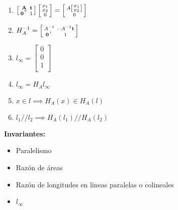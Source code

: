 \documentclass[12pt,a4paper]{article}
\begin{document}
\begin{itemize}
\begin{enumerate}
		\item $\left[ {\begin{smallmatrix}
		 {\bf A} & {\bf t}\\
		 {\bf 0}^{\top} & 1 \\
		\end{smallmatrix} } \right] \left[ {\begin{smallmatrix}
		 x_{1}\\
		 x_{2}\\
		 0\\
		\end{smallmatrix} } \right] = \left[ {\begin{smallmatrix}
		 A\left[ {\begin{smallmatrix}
		  x_{1}\\
		   x_{2}\\
		 \end{smallmatrix} } \right]\\
		 0\\
		\end{smallmatrix} } \right]
		$

		\item $
		H_{A}^{-1} =
		\left[ {\begin{smallmatrix}
		 A^{-1} & -A^{-1}{\bf t}\\
		 {\bf 0}^{\top} & 1 \\
		\end{smallmatrix} } \right]
		$

		\item $l_{\infty} = \left[ {\begin{smallmatrix}
		 0\\
		 0\\
		 1\\
		\end{smallmatrix} } \right]$

		\item $l_{\infty} = H_{A} l_{\infty}$

		\item $x \in l \implies H_{A}(x) \in H_{A}(l)$

		\item $l_{1} // l_{2} \implies H_{A}(l_{1})//H_{A}(l_{2})$
	\end{enumerate}
	
	{\bf Invariantes:} 
	\begin{itemize}
		\item Paralelismo
		\item Raz\'on de \'areas
		\item Raz\'on de longitudes en lineas paralelas o colineales
		\item $l_{\infty}$
	\end{itemize}


\end{itemize}
\end{document}
